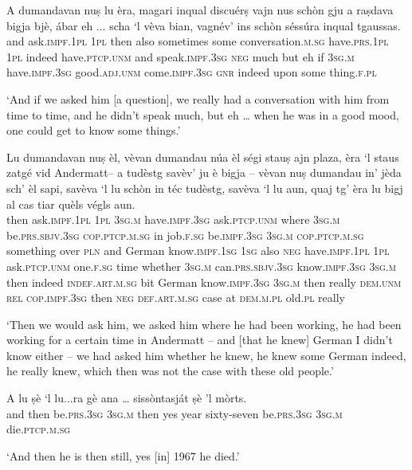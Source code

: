 \begin{linenumbers}
\gll  A dumandavan nuṣ lu èra, magari inqual discuérṣ vajn nus schòn gju a raṣdava bigja bjè, ábar eh ... scha `l vèva bian, vagnév’ ins schòn séssúra inqual tgaussas.  \\
and ask.\textsc{impf.1pl} \textsc{1pl} then also sometimes some conversation.\textsc{m.sg} have.\textsc{prs.1pl} \textsc{1pl} indeed have.\textsc{ptcp.unm} and speak.\textsc{impf.3sg} \textsc{neg} much but eh {} if \textsc{3sg.m}  have.\textsc{impf.3sg} good.\textsc{adj.unm} come.\textsc{impf.3sg} \textsc{gnr} indeed upon some thing.\textsc{f.pl} \\
\end{linenumbers}
\medskip
\glt `And if we asked him [a question], we really had a conversation with him from time to time, and he didn’t speak much, but eh … when he was in a good mood, one could get to know some things.'
\medskip

\begin{linenumbers}
\gll Lu dumandavan nuṣ èl, vèvan dumandau núa èl ségi stauṣ ajn plaza, èra `l staus zatgé vid Andermatt– a tudèstg savèv’ ju è bigja – vèvan nuṣ dumandau in' jèda sch’ èl sapi, savèva `l lu schòn in téc tudèstg, savèva `l lu aun, quaj tg’ èra lu bigj al cas tiar quèls végls aun.   \\
then ask.\textsc{impf.1pl} \textsc{1pl} \textsc{3sg.m} have.\textsc{impf.3sg}  ask.\textsc{ptcp.unm} where \textsc{3sg.m} be.\textsc{prs.sbjv.3sg} \textsc{cop.ptcp.m.sg} in job.\textsc{f.sg} be.\textsc{impf.3sg} \textsc{3sg.m}  \textsc{cop.ptcp.m.sg} something over \textsc{pln} and German know.\textsc{impf.1sg} \textsc{1sg} also \textsc{neg} {} have.\textsc{impf.1pl} \textsc{1pl} ask.\textsc{ptcp.unm} one.\textsc{f.sg} time whether \textsc{3sg.m} can.\textsc{prs.sbjv.3sg} know.\textsc{impf.3sg} \textsc{3sg.m} then indeed \textsc{indef.art.m.sg} bit German know.\textsc{impf.3sg} \textsc{3sg.m} then really \textsc{dem.unm} \textsc{rel} \textsc{cop.impf.3sg} then \textsc{neg} \textsc{def.art.m.sg} case at \textsc{dem.m.pl} old.\textsc{pl} really \\
\end{linenumbers}
\medskip
\glt `Then we would ask him, we asked him where he had been working, he had been working for a certain time in Andermatt – and [that he knew] German I didn't know either – we had asked him whether he knew, he knew some German indeed, he really knew, which then was not the case with these old people.'
\medskip

\begin{linenumbers}
\gll  A lu ṣè `l lu...ra gè ana … sissòntasját ṣè ’l mòrts. \\
and then be.\textsc{prs.3sg} \textsc{3sg.m} then yes year {} sixty-seven be.\textsc{prs.3sg} \textsc{3sg.m} die.\textsc{ptcp.m.sg} \\
\end{linenumbers}
\medskip
\glt `And then he is then still, yes [in] 1967 he died.'
\medskip

